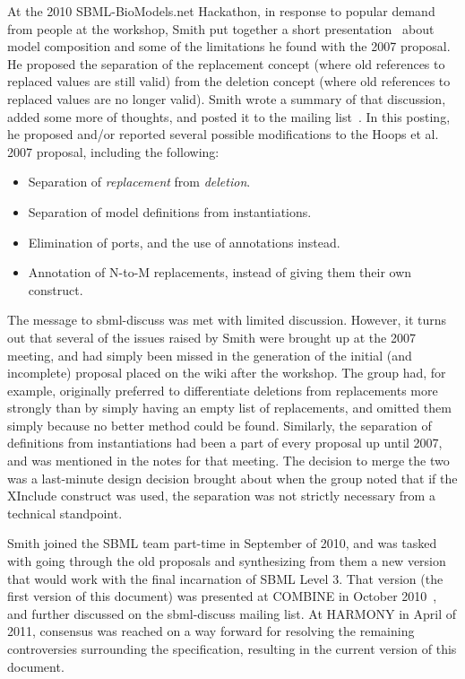 At the 2010 SBML-BioModels.net Hackathon, in response to popular demand
from people at the workshop, Smith put together a short
presentation~\cite{x} about model composition and some of the
limitations he found with the 2007 proposal.  He proposed the separation
of the replacement concept (where old references to replaced values are
still valid) from the deletion concept (where old references to replaced
values are no longer valid).  Smith wrote a summary of that discussion,
added some more of thoughts, and posted it to the
 mailing
list~\cite{x}.  In this posting, he proposed and/or reported several
possible modifications to the Hoops et al. 2007 proposal, including the
following:

\begin{itemize}

\item Separation of \emph{replacement} from \emph{deletion}.

\item Separation of model definitions from instantiations.

\item Elimination of ports, and the use of annotations instead.

\item Annotation of N-to-M replacements, instead of giving them their
  own construct.

\end{itemize}

The message to sbml-discuss was met with limited discussion.  However,
it turns out that several of the issues raised by Smith were brought up
at the 2007 meeting, and had simply been missed in the generation of the
initial (and incomplete) proposal placed on the wiki after the
workshop.  The group had, for example, originally preferred to
differentiate deletions from replacements more strongly than by simply
having an empty list of replacements, and omitted them simply because no
better method could be found.  Similarly, the separation of definitions
from instantiations had been a part of every proposal up until 2007, and
was mentioned in the notes for that meeting.  The decision to merge the
two was a last-minute design decision brought about when the group noted
that if the XInclude construct was used, the separation was not strictly
necessary from a technical standpoint.

Smith joined the SBML team part-time in September of 2010, and was
tasked with going through the old proposals and synthesizing from them a
new version that would work with the final incarnation of SBML Level 3.
That version (the first version of this document) was presented at
COMBINE in October 2010~\cite{x}, and further discussed on the
sbml-discuss mailing list.  At HARMONY in April of 2011, consensus was
reached on a way forward for resolving the remaining controversies
surrounding the specification, resulting in the current version of this
document.


